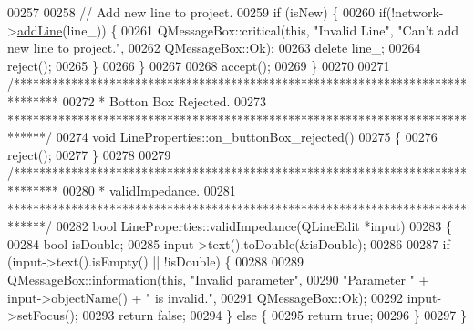 \begin{DoxyCode}
00257 
00258   \textcolor{comment}{// Add new line to project.}
00259   \textcolor{keywordflow}{if} (isNew) \{
00260     \textcolor{keywordflow}{if}(!network->\hyperlink{group___models_gae02945131494987b3ff9b59b627719b4}{addLine}(line\_)) \{
00261       QMessageBox::critical(\textcolor{keyword}{this}, \textcolor{stringliteral}{"Invalid Line"}, \textcolor{stringliteral}{"Can't add new line to project."},
00262                             QMessageBox::Ok);
00263       \textcolor{keyword}{delete} line\_;
00264       reject();
00265     \}
00266   \}
00267 
00268   accept();
00269 \}
00270 
00271 \textcolor{comment}{/*******************************************************************************}
00272 \textcolor{comment}{ * Botton Box Rejected.}
00273 \textcolor{comment}{ ******************************************************************************/}
00274 \textcolor{keywordtype}{void} LineProperties::on\_buttonBox\_rejected()
00275 \{
00276   reject();
00277 \}
00278 
00279 \textcolor{comment}{/*******************************************************************************}
00280 \textcolor{comment}{ * validImpedance.}
00281 \textcolor{comment}{ ******************************************************************************/}
00282 \textcolor{keywordtype}{bool} LineProperties::validImpedance(QLineEdit *input)
00283 \{
00284   \textcolor{keywordtype}{bool} isDouble;
00285   input->text().toDouble(&isDouble);
00286 
00287   \textcolor{keywordflow}{if} (input->text().isEmpty() || !isDouble) \{
00288 
00289     QMessageBox::information(\textcolor{keyword}{this}, \textcolor{stringliteral}{"Invalid parameter"},
00290                              \textcolor{stringliteral}{"Parameter "} + input->objectName() + \textcolor{stringliteral}{" is invalid."},
00291                              QMessageBox::Ok);
00292     input->setFocus();
00293     \textcolor{keywordflow}{return} \textcolor{keyword}{false};
00294   \} \textcolor{keywordflow}{else} \{
00295     \textcolor{keywordflow}{return} \textcolor{keyword}{true};
00296   \}
00297 \}
\end{DoxyCode}
